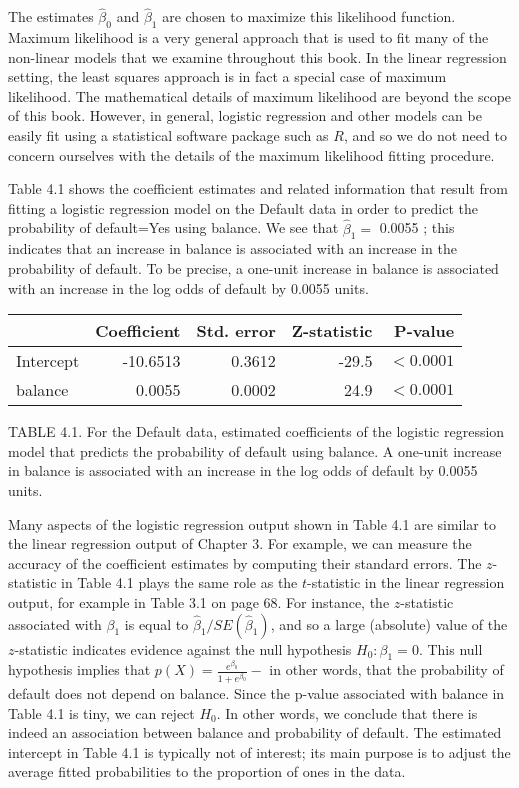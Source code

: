 \documentclass[10pt]{article}
\begin{document}
The estimates $\hat{\beta}_{0}$ and $\hat{\beta}_{1}$ are chosen to maximize this likelihood function.\\
Maximum likelihood is a very general approach that is used to fit many of the non-linear models that we examine throughout this book. In the linear regression setting, the least squares approach is in fact a special case of maximum likelihood. The mathematical details of maximum likelihood are beyond the scope of this book. However, in general, logistic regression and other models can be easily fit using a statistical software package such as $R$, and so we do not need to concern ourselves with the details of the maximum likelihood fitting procedure.

Table 4.1 shows the coefficient estimates and related information that result from fitting a logistic regression model on the Default data in order to predict the probability of default=Yes using balance. We see that $\hat{\beta}_{1}=$ 0.0055 ; this indicates that an increase in balance is associated with an increase in the probability of default. To be precise, a one-unit increase in balance is associated with an increase in the log odds of default by 0.0055 units.


\begin{center}
\begin{tabular}{l|rrrr}
\hline
 & Coefficient & Std. error & Z-statistic & P-value \\
\hline
Intercept & -10.6513 & 0.3612 & -29.5 & $<0.0001$ \\
balance & 0.0055 & 0.0002 & 24.9 & $<0.0001$ \\
\hline
\end{tabular}
\end{center}

TABLE 4.1. For the Default data, estimated coefficients of the logistic regression model that predicts the probability of default using balance. A one-unit increase in balance is associated with an increase in the log odds of default by 0.0055 units.

Many aspects of the logistic regression output shown in Table 4.1 are similar to the linear regression output of Chapter 3. For example, we can measure the accuracy of the coefficient estimates by computing their standard errors. The $z$-statistic in Table 4.1 plays the same role as the $t$-statistic in the linear regression output, for example in Table 3.1 on page 68. For instance, the $z$-statistic associated with $\beta_{1}$ is equal to $\hat{\beta}_{1} / S E\left(\hat{\beta}_{1}\right)$, and so a large (absolute) value of the $z$-statistic indicates evidence against the null hypothesis $H_{0}: \beta_{1}=0$. This null hypothesis implies that $p(X)=\frac{e^{\beta_{0}}}{1+e^{\beta_{0}}}-$ in other words, that the probability of default does not depend on balance. Since the p-value associated with balance in Table 4.1 is tiny, we can reject $H_{0}$. In other words, we conclude that there is indeed an association between balance and probability of default. The estimated intercept in Table 4.1 is typically not of interest; its main purpose is to adjust the average fitted probabilities to the proportion of ones in the data.
\end{document}
